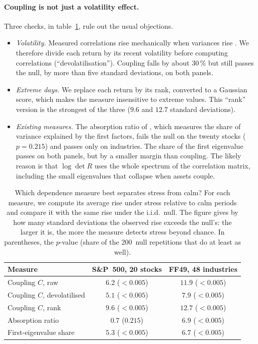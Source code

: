 \documentclass[11pt]{article}
\theoremstyle{definition}
\begin{document}
\paragraph{Coupling is not just a volatility effect.} Three checks, in
table~\ref{tab:cb-measures}, rule out the usual objections.
\begin{itemize}
\item \emph{Volatility.} Measured correlations rise mechanically when
variances rise \citep{forbes2002}. We therefore divide each return by its
recent volatility before computing correlations (``devolatilisation'').
Coupling falls by about $30\,\%$ but still passes the null, by more than five
standard deviations, on both panels.
\item \emph{Extreme days.} We replace each return by its rank, converted to a
Gaussian score, which makes the measure insensitive to extreme values. This
``rank'' version is the strongest of the three ($9.6$ and $12.7$ standard
deviations).
\item \emph{Existing measures.} The absorption ratio of \citet{kritzman2011},
which measures the share of variance explained by the first factors, fails
the null on the twenty stocks ($p=0.215$) and passes only on industries. The
share of the first eigenvalue passes on both panels, but by a smaller margin
than coupling. The likely reason is that $\log\det R$ uses the whole spectrum
of the correlation matrix, including the small eigenvalues that collapse when
assets couple.
\end{itemize}

\begin{table}[htbp]
\centering
\small
\begin{tabular}{@{}lcc@{}}
\toprule
Measure & S\&P~500, 20 stocks & FF49, 48 industries \\
\midrule
Coupling $C$, raw & $6.2$ ($<0.005$) & $11.9$ ($<0.005$) \\
Coupling $C$, devolatilised & $5.1$ ($<0.005$) & $7.9$ ($<0.005$) \\
Coupling $C$, rank & $\mathbf{9.6}$ ($\mathbf{<0.005}$) & $\mathbf{12.7}$ ($\mathbf{<0.005}$) \\
Absorption ratio & $0.7$ ($0.215$) & $6.9$ ($<0.005$) \\
First-eigenvalue share & $5.3$ ($<0.005$) & $6.7$ ($<0.005$) \\
\bottomrule
\end{tabular}
\caption{Which dependence measure best separates stress from calm? For each
measure, we compute its average rise under stress relative to calm periods and
compare it with the same rise under the i.i.d.\ null. The figure gives by how
many standard deviations the observed rise exceeds the null's: the larger it
is, the more the measure detects stress beyond chance. In parentheses, the
$p$-value (share of the 200~null repetitions that do at least as well).}
\label{tab:cb-measures}
\end{table}
\end{document}
